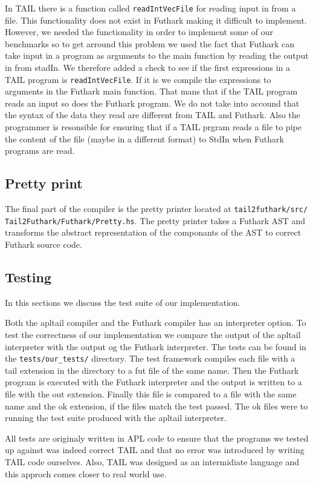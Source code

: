 \documentclass[11pt]{article}
\begin{document}
In TAIL there is a function called {\tt readIntVecFile} for reading input in from a file. This functionality does not exist in Futhark making it difficult to implement. However, we needed the functionality in order to implement some of our benchmarks so to get arround this problem we used the fact that Futhark can take input in a program as arguments to the main function by reading the output in from stadIn. We therefore added a check to see if the first expressions in a TAIL program is {\tt readIntVecFile}. If it is we compile the expressions to arguments in the Futhark main function. That mans that if the TAIL program reads an input so does the Futhark program. We do not take into accound that the syntax of the data they read are different from TAIL and Futhark. Also the programmer is resonsible for ensuring that if a TAIL prgram reads a file to pipe the content of the file (maybe in a different format) to StdIn when Futhark programs are read. 


\subsection{Pretty print}
The final part of the compiler is the pretty printer located at {\tt tail2futhark/src/
Tail2Futhark/Futhark/Pretty.hs}. 
The pretty printer takes a Futhark AST and transforms the abstract representation of the componants of the AST to correct Futhark source code. 

\subsection{Testing}

In this sections we discuss the test suite of our implementation.

Both the apltail compiler and the Futhark compiler has an interpreter option.
To test the correctness of our implementation we compare the output of the apltail interpreter with the output og the Futhark interpreter.
The tests can be found in the {\tt tests/our\_tests/} directory.
The test framework compiles each file with a tail extension in the directory to a fut file of the same name. Then the Futhark program
is executed with the Futhark interpreter and the output is written to a file with the out extension.
Finally this file is compared to a file with the same name and the ok extension, if the files match the test passed.
The ok files were to running the test suite produced with the apltail interpreter.

All tests are originaly written in APL code to ensure that the programs we tested up against was indeed correct TAIL and that no error was introduced by writing TAIL code ourselves. Also, TAIL was designed as an intermidiate language and this approch comes closer to real world use.
\end{document}
